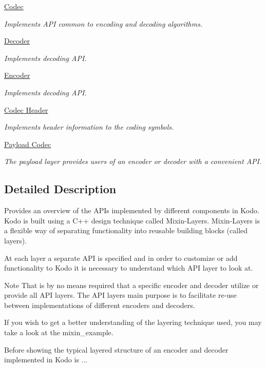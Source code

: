 \begin{DoxyCompactItemize}
\hyperlink{group__codec}{Codec}
\begin{DoxyCompactList}\small\item\em Implements A\-P\-I common to encoding and decoding algorithms. \end{DoxyCompactList}\item 
\hyperlink{group__decoder}{Decoder}
\begin{DoxyCompactList}\small\item\em Implements decoding A\-P\-I. \end{DoxyCompactList}\item 
\hyperlink{group__encoder}{Encoder}
\begin{DoxyCompactList}\small\item\em Implements decoding A\-P\-I. \end{DoxyCompactList}\item 
\hyperlink{group__codec__header}{Codec Header}
\begin{DoxyCompactList}\small\item\em Implements header information to the coding symbols. \end{DoxyCompactList}\item 
\hyperlink{group__payload__codec}{Payload Codec}
\begin{DoxyCompactList}\small\item\em The payload layer provides users of an encoder or decoder with a convenient A\-P\-I. \end{DoxyCompactList}\end{DoxyCompactItemize}


\subsection{Detailed Description}
Provides an overview of the A\-P\-Is implemented by different components in Kodo. Kodo is built using a C++ design technique called Mixin-\/\-Layers. Mixin-\/\-Layers is a flexible way of separating functionality into reusable building blocks (called layers).

At each layer a separate A\-P\-I is specified and in order to customize or add functionality to Kodo it is necessary to understand which A\-P\-I layer to look at.

\begin{DoxyNote}{Note}
That is by no means required that a specific encoder and decoder utilize or provide all A\-P\-I layers. The A\-P\-I layers main purpose is to facilitate re-\/use between implementations of different encoders and decoders.
\end{DoxyNote}
If you wish to get a better understanding of the layering technique used, you may take a look at the mixin\-\_\-example.

Before showing the typical layered structure of an encoder and decoder implemented in Kodo is ... 